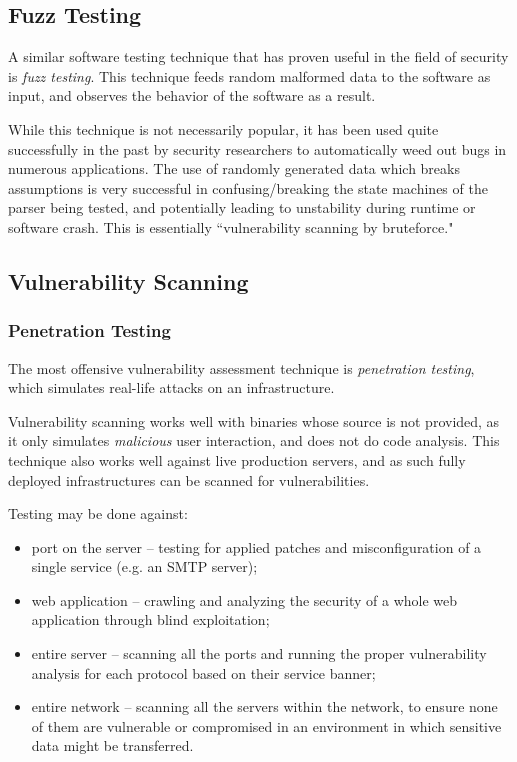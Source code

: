 \documentclass[a4paper,12pt]{article}
\begin{document}
\subsection{Fuzz Testing}
	
	A similar software testing technique that has proven useful in the field of security is \textit{fuzz testing}. This technique feeds random malformed data to the software as input, and observes the behavior of the software as a result.
	
	While this technique is not necessarily popular, it has been used quite successfully in the past by security researchers to automatically weed out bugs in numerous applications.\cite{mzalewski15} The use of randomly generated data which breaks assumptions is very successful in confusing/breaking the state machines of the parser being tested, and potentially leading to unstability during runtime or software crash. This is essentially ``vulnerability scanning by bruteforce."
	
\subsection{Vulnerability Scanning}
	
\subsubsection{Penetration Testing}
	
	The most offensive vulnerability assessment technique is \textit{penetration testing}, which simulates real-life attacks on an infrastructure.
	
	Vulnerability scanning works well with binaries whose source is not provided, as it only simulates \textit{malicious} user interaction, and does not do code analysis. This technique also works well against live production servers, and as such fully deployed infrastructures can be scanned for vulnerabilities.
	
	\noindent Testing may be done against:
	
	\begin{itemize}
		\item port on the server -- testing for applied patches and misconfiguration of a single service (e.g. an SMTP server);
		\item web application -- crawling and analyzing the security of a whole web application through blind exploitation;
		\item entire server -- scanning all the ports and running the proper vulnerability analysis for each protocol based on their service banner;
		\item entire network -- scanning all the servers within the network, to ensure none of them are vulnerable or compromised in an environment in which sensitive data might be transferred.
	\end{itemize}
	
\end{document}
